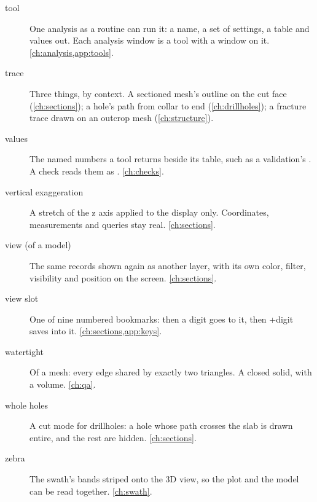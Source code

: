 \begin{description}
\item[tool] One analysis as a routine can run it: a name, a set of settings, a table and values
  out. Each analysis window is a tool with a window on it. \cref{ch:analysis,app:tools}.

\item[trace] Three things, by context. A sectioned mesh's outline on the cut face
  (\cref{ch:sections}); a hole's path from collar to end (\cref{ch:drillholes}); a fracture trace
  drawn on an outcrop mesh (\cref{ch:structure}).

\item[values] The named numbers a tool returns beside its table, such as a validation's
  . A check reads them as . \cref{ch:checks}.

\item[vertical exaggeration] A stretch of the z axis applied to the display only. Coordinates,
  measurements and queries stay real. \cref{ch:sections}.

\item[view (of a model)] The same records shown again as another layer, with its own color,
  filter, visibility and position on the screen. \cref{ch:sections}.

\item[view slot] One of nine numbered bookmarks:  then a digit goes to it,  then
  +digit saves into it. \cref{ch:sections,app:keys}.

\item[watertight] Of a mesh: every edge shared by exactly two triangles. A closed solid, with a
  volume. \cref{ch:qa}.

\item[whole holes] A cut mode for drillholes: a hole whose path crosses the slab is drawn entire,
  and the rest are hidden. \cref{ch:sections}.

\item[zebra] The swath's bands striped onto the 3D view, so the plot and the model can be read
  together. \cref{ch:swath}.

\end{description}
